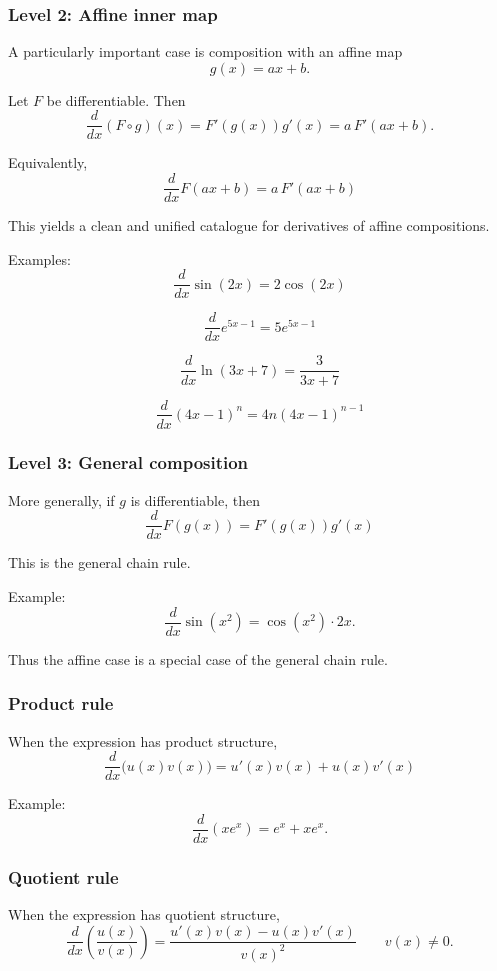\documentclass{article}
\begin{document}
	\subsubsection{Level 2: Affine inner map}
	
	A particularly important case is composition with an affine map
	\[
	g(x)=ax+b.
	\]
	
	Let \(F\) be differentiable. Then
	\[
	\frac{d}{dx}(F\circ g)(x)
	=
	F'(g(x))g'(x)
	=
	a\,F'(ax+b).
	\]
	
	Equivalently,
	\[
	\boxed{
		\frac{d}{dx}F(ax+b)=a\,F'(ax+b)
	}
	\]
	
	This yields a clean and unified catalogue for derivatives of affine compositions.
	
	Examples:
	\[
	\frac{d}{dx}\sin(2x)=2\cos(2x)
	\]
	
	\[
	\frac{d}{dx}e^{5x-1}=5e^{5x-1}
	\]
	
	\[
	\frac{d}{dx}\ln(3x+7)=\frac{3}{3x+7}
	\]
	
	\[
	\frac{d}{dx}(4x-1)^n
	=
	4n(4x-1)^{n-1}
	\]
	
	\subsubsection{Level 3: General composition}
	
	More generally, if \(g\) is differentiable, then
	\[
	\boxed{
		\frac{d}{dx}F(g(x))=F'(g(x))g'(x)
	}
	\]
	
	This is the general chain rule.
	
	Example:
	\[
	\frac{d}{dx}\sin(x^2)=\cos(x^2)\cdot 2x.
	\]
	
	Thus the affine case is a special case of the general chain rule.
	
	\subsubsection{Product rule}
	
	When the expression has product structure,
	\[
	\boxed{
		\frac{d}{dx}\bigl(u(x)v(x)\bigr)=u'(x)v(x)+u(x)v'(x)
	}
	\]
	
	Example:
	\[
	\frac{d}{dx}(xe^x)=e^x+xe^x.
	\]
	
	\subsubsection{Quotient rule}
	
	When the expression has quotient structure,
	\[
	\boxed{
		\frac{d}{dx}\left(\frac{u(x)}{v(x)}\right)
		=
		\frac{u'(x)v(x)-u(x)v'(x)}{v(x)^2}
	}
	\qquad v(x)\neq 0.
	\]
	
\end{document}
